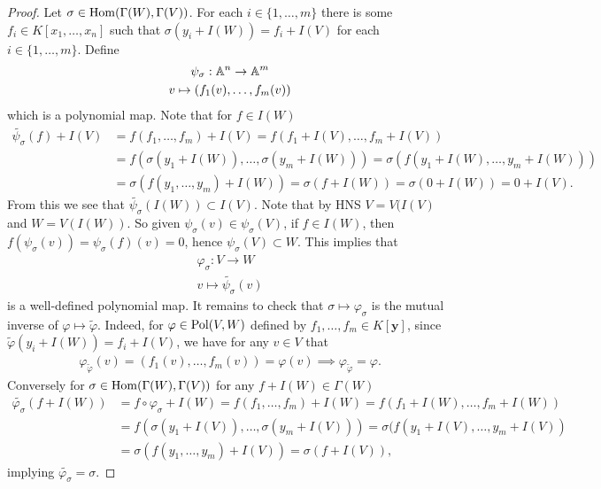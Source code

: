 \begin{proof}
    Let $\sigma \in \mathrm{Hom}(\Gamma(W),\Gamma(V))$. For each $i\in\{1,\dots,m\}$ there is some $f_i\in K[x_1,\dots,x_n]$ such that $\sigma(y_i + I(W)) = f_i + I(V)$ for each $i\in\{1,\dots,m\}$. Define
    \begin{gather*}
        \psi_\sigma : \mathbb{A}^n \rightarrow \mathbb{A}^m\\
        v\mapsto (f_1(v),\dots,f_m(v))
    \end{gather*}
    which is a polynomial map. Note that for $f\in I(W)$
    \begin{align*}
        \widetilde{\psi_{\sigma}}(f) + I(V) &= f(f_1,\dots,f_m) + I(V) = f(f_1+I(V),\dots,f_m+I(V))\\ 
        &= f(\sigma(y_1+I(W)),\dots,\sigma(y_m+I(W))) = \sigma\left(f\left(y_1+I\left(W\right),\dots,y_m+I\left(W\right)\right)\right)\\ 
        &= \sigma( f(y_1,\dots,y_m)+I(W))=\sigma( f+I(W))=\sigma(0+I(W)) = 0 +I(V).
    \end{align*}
    From this we see that $\widetilde{\psi_\sigma}(I(W))\subset I(V)$. Note that by HNS $V = V(I(V)$ and $W = V(I(W))$.  So given $\psi_{\sigma}(v) \in \psi_{\sigma}(V)$, if $f\in I(W)$, then $f(\psi_\sigma(v))=\psi_\sigma(f)(v) = 0 $, hence $\psi_\sigma(V) \subset W$. This implies that 
    \begin{gather*}
        \varphi_\sigma : V \rightarrow W\\
        v\mapsto \widetilde{\psi_\sigma}(v)
    \end{gather*}
    is a well-defined polynomial map. It remains to check that $\sigma \mapsto \varphi_\sigma$ is the mutual inverse of $\varphi \mapsto \widetilde{\varphi}$. Indeed, for $\varphi\in \mathrm{Pol}(V,W)$ defined by $f_1,\dots,f_m\in K[\mathbf{y}]$, since $\widetilde{\varphi}(y_i+I(W))=f_i+I(V)$, we have for any $v\in V$ that
    \begin{align*}
        \varphi_{\widetilde{\varphi}}(v)= (f_1(v),\dots,f_m(v))=\varphi(v) \implies \varphi_{\widetilde{\varphi}} = \varphi.
    \end{align*}
    Conversely for $\sigma\in \mathrm{Hom}(\Gamma(W),\Gamma(V))$ for any $f + I(W) \in \Gamma(W)$
    \begin{align*}
        \widetilde{\varphi_\sigma}(f+I(W))&=f\circ \varphi_\sigma + I(W) =f(f_1,\dots,f_m) + I(W) = f(f_1+I(W),\dots, f_m+I(W))\\ 
        &= f(\sigma(y_1+I(V)),\dots, \sigma(y_m+I(V))) = \sigma(f(y_1+I(V),\dots,y_m+I(V))\\ 
        &= \sigma(f(y_1,\dots,y_m)+I(V))= \sigma(f+I(V)),
    \end{align*}
    implying $\widetilde{\varphi_\sigma} = \sigma$.
\end{proof}
